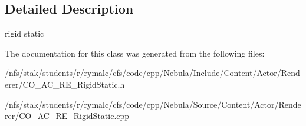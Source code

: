 \subsection{Detailed Description}
rigid static 

The documentation for this class was generated from the following files:\begin{DoxyCompactItemize}
\item 
/nfs/stak/students/r/rymalc/cfs/code/cpp/Nebula/Include/Content/Actor/Renderer/CO\_\-AC\_\-RE\_\-RigidStatic.h\item 
/nfs/stak/students/r/rymalc/cfs/code/cpp/Nebula/Source/Content/Actor/Renderer/CO\_\-AC\_\-RE\_\-RigidStatic.cpp\end{DoxyCompactItemize}
